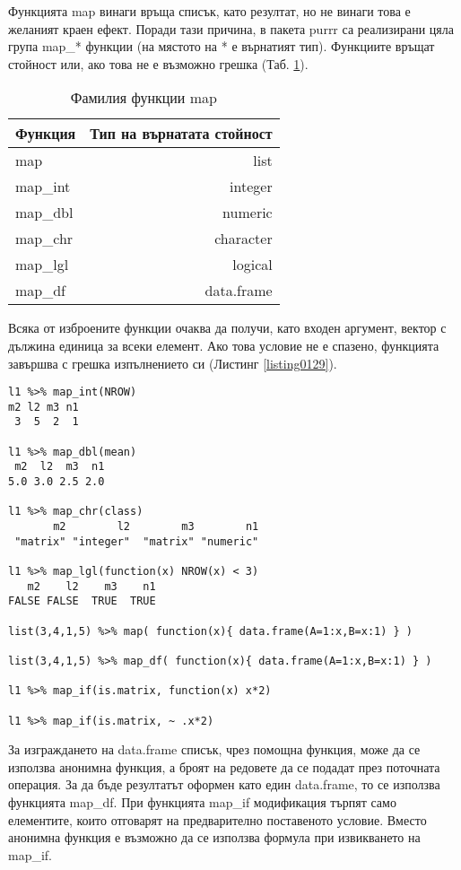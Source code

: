 Функцията map винаги връща списък, като резултат, но не винаги това е желаният краен ефект. Поради тази причина, в пакета purrr са реализирани цяла група map\_* функции (на мястото на * е върнатият тип). Функциите връщат стойност или, ако това не е възможно грешка (Таб. \ref{table0004}). 

\begin{table}[h!]
\centering
\begin{tabular}{|l|r|} 
  \rowcolor{lightgray}
  \hline
  Функция & Тип на върнатата стойност \\ [0.1ex] 
  \hline\hline
  map & list \\
  \hline
  map\_int & integer \\
  \hline
  map\_dbl & numeric \\
  \hline
  map\_chr & character \\
  \hline
  map\_lgl & logical \\
  \hline
  map\_df & data.frame \\
  \hline
\end{tabular}
\caption{Фамилия функции map}
\label{table0004}
\end{table}

Всяка от изброените функции очаква да получи, като входен аргумент, вектор с дължина единица за всеки елемент. Ако това условие не е спазено, функцията завършва с грешка изпълнението си (Листинг \ref{listing0129}). 

\begin{lstlisting}[caption=Извиквания на map\, според тип на върнатата стойност, label=listing0129]
l1 %>% map_int(NROW)
m2 l2 m3 n1 
 3  5  2  1 
 
l1 %>% map_dbl(mean)
 m2  l2  m3  n1 
5.0 3.0 2.5 2.0 

l1 %>% map_chr(class)
       m2        l2        m3        n1 
 "matrix" "integer"  "matrix" "numeric" 

l1 %>% map_lgl(function(x) NROW(x) < 3)
   m2    l2    m3    n1 
FALSE FALSE  TRUE  TRUE 

list(3,4,1,5) %>% map( function(x){ data.frame(A=1:x,B=x:1) } )

list(3,4,1,5) %>% map_df( function(x){ data.frame(A=1:x,B=x:1) } )

l1 %>% map_if(is.matrix, function(x) x*2)

l1 %>% map_if(is.matrix, ~ .x*2)
\end{lstlisting}

За изграждането на data.frame списък, чрез помощна функция, може да се използва анонимна функция, а броят на редовете да се подадат през поточната операция. За да бъде резултатът оформен като един data.frame, то се използва функцията map\_df. При функцията map\_if модификация търпят само елементите, които отговарят на предварително поставеното условие. Вместо анонимна функция е възможно да се използва формула при извикването на map\_if.  


